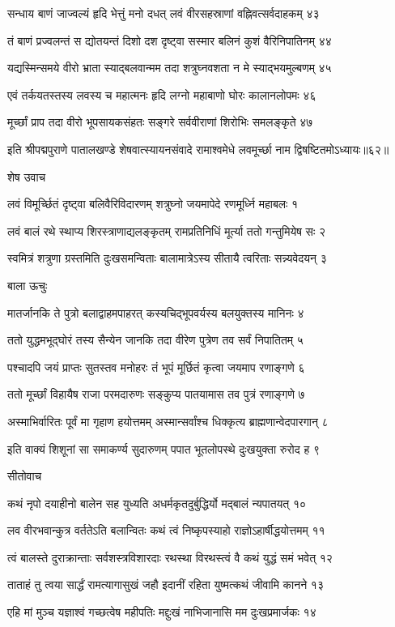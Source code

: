 सन्धाय बाणं जाज्वल्यं हृदि भेत्तुं मनो दधत्
लवं वीरसहस्राणां वह्निवत्सर्वदाहकम् ४३

तं बाणं प्रज्वलन्तं स द्योतयन्तं दिशो दश
दृष्ट्वा सस्मार बलिनं कुशं वैरिनिपातिनम् ४४

यद्यस्मिन्समये वीरो भ्राता स्याद्बलवान्मम
तदा शत्रुघ्नवशता न मे स्याद्भयमुल्बणम् ४५

एवं तर्कयतस्तस्य लवस्य च महात्मनः
हृदि लग्नो महाबाणो घोरः कालानलोपमः ४६

मूर्च्छां प्राप तदा वीरो भूपसायकसंहतः
सङ्गरे सर्ववीराणां शिरोभिः समलङ्कृते ४७

इति श्रीपद्मपुराणे पातालखण्डे शेषवात्स्यायनसंवादे रामाश्वमेधे लवमूर्च्छा नाम द्विषष्टितमोऽध्यायः॥६२॥


शेष उवाच

लवं विमूर्च्छितं दृष्ट्वा बलिवैरिविदारणम्
शत्रुघ्नो जयमापेदे रणमूर्ध्नि महाबलः १

लवं बालं रथे स्थाप्य शिरस्त्राणाद्यलङ्कृतम्
रामप्रतिनिधिं मूर्त्या ततो गन्तुमियेष सः २

स्वमित्रं शत्रुणा ग्रस्तमिति दुःखसमन्विताः
बालामात्रेऽस्य सीतायै त्वरिताः सन्न्यवेदयन् ३

बाला ऊचुः

मातर्जानकि ते पुत्रो बलाद्वाहमपाहरत्
कस्यचिद्भूपवर्यस्य बलयुक्तस्य मानिनः ४

ततो युद्धमभूद्घोरं तस्य सैन्येन जानकि
तदा वीरेण पुत्रेण तव सर्वं निपातितम् ५

पश्चादपि जयं प्राप्तः सुतस्तव मनोहरः
तं भूपं मूर्छितं कृत्वा जयमाप रणाङ्गणे ६

ततो मूर्च्छां विहायैष राजा परमदारुणः
सङ्कुप्य पातयामास तव पुत्रं रणाङ्गणे ७

अस्माभिर्वारितः पूर्वं मा गृहाण हयोत्तमम्
अस्मान्सर्वांश्च धिक्कृत्य ब्राह्मणान्वेदपारगान् ८

इति वाक्यं शिशूनां सा समाकर्ण्य सुदारुणम्
पपात भूतलोपस्थे दुःखयुक्ता रुरोद ह ९

सीतोवाच

कथं नृपो दयाहीनो बालेन सह युध्यति
अधर्मकृतदुर्बुद्धिर्यो मद्बालं न्यपातयत् १०

लव वीरभवान्कुत्र वर्ततेऽति बलान्वितः
कथं त्वं निष्कृपस्याहो राज्ञोऽहार्षीद्धयोत्तमम् ११

त्वं बालस्ते दुराक्रान्ताः सर्वशस्त्रविशारदाः
रथस्था विरथस्त्वं वै कथं युद्धं समं भवेत् १२

ताताहं तु त्वया सार्द्धं रामत्यागासुखं जहौ
इदानीं रहिता युष्मत्कथं जीवामि कानने १३

एहि मां मुञ्च यज्ञाश्वं गच्छत्वेष महीपतिः
मद्दुःखं नाभिजानासि मम दुःखप्रमार्जकः १४

